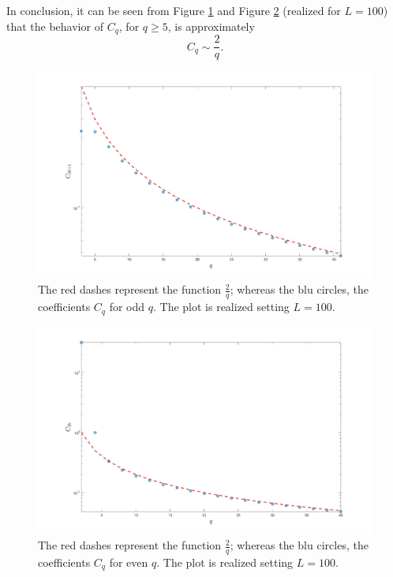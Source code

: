 \documentclass[aps,prd,showpacs,superscriptaddress,groupedaddress]{revtex4-1}  %
\begin{document}
In conclusion, it can be seen from Figure \ref{fig:cqcome2suqcopy} and Figure \ref{fig:c2k} (realized for $L=100$) that the behavior of $C_q$, for $q\geq 5$, is  approximately 
\begin{equation}\label{Cq-approx}
C_q \sim \dfrac{2}{q}.
\end{equation}

\begin{figure}[h!]
	\centering
	\includegraphics[width=0.8\linewidth]{Cqcome2suqcopy}
	\caption{The red dashes represent the function $\frac{2}{q}$; whereas the blu circles, the coefficients $C_q$ for odd $q$. The plot is realized setting $L=100$.}
	\label{fig:cqcome2suqcopy}
\end{figure}
\begin{figure}[h!]
	\centering
	\includegraphics[width=0.8\linewidth]{C2k}
	\caption{The red dashes represent the function $\frac{2}{q}$; whereas the blu circles, the coefficients $C_q$ for even $q$. The plot is realized setting $L=100$.}
	\label{fig:c2k}
\end{figure}
\end{document}
